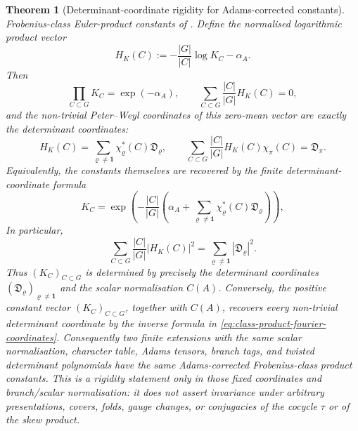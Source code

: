 \documentclass[11pt,a4paper]{amsart}
\theoremstyle{plain}
\newtheorem{theorem}{Theorem}[section]
\theoremstyle{definition}
\theoremstyle{remark}
\begin{document}
\begin{theorem}[Determinant-coordinate rigidity for Adams-corrected constants]
  Frobenius-class Euler-product constants of
  .  Define the normalised logarithmic
  product vector
  \begin{equation}\label{eq:class-product-log-vector}
    H_K(C):=-\frac{|G|}{|C|}\log K_C-\alpha_A .
  \end{equation}
  Then
  \begin{equation}\label{eq:class-product-normalisation-constraint}
    \prod_{C\subset G}K_C=\exp(-\alpha_A),
    \qquad
    \sum_{C\subset G}\frac{|C|}{|G|}H_K(C)=0,
  \end{equation}
  and the non-trivial Peter--Weyl coordinates of this zero-mean vector are
  exactly the determinant coordinates:
  \begin{equation}\label{eq:class-product-fourier-coordinates}
    H_K(C)=
    \sum_{\varrho\ne\mathbf1}
      \chi_\varrho^\ast(C)\mathfrak D_\varrho,
    \qquad
    \sum_{C\subset G}\frac{|C|}{|G|}H_K(C)\chi_\pi(C)
    =\mathfrak D_\pi.
  \end{equation}
  Equivalently, the constants themselves are recovered by the finite
  determinant-coordinate formula
  \begin{equation}\label{eq:class-product-rigidity-product-formula}
    K_C=
    \exp\!\left(
      -\frac{|C|}{|G|}
      \left(
        \alpha_A+
        \sum_{\varrho\ne\mathbf1}
          \chi_\varrho^\ast(C)\mathfrak D_\varrho
      \right)
    \right),
  \end{equation}
  In particular,
  \begin{equation}\label{eq:class-product-parseval}
    \sum_{C\subset G}\frac{|C|}{|G|}|H_K(C)|^2
    =
    \sum_{\varrho\ne\mathbf1}|\mathfrak D_\varrho|^2.
  \end{equation}
  Thus \((K_C)_{C\subset G}\) is determined by precisely the determinant
  coordinates \((\mathfrak D_\varrho)_{\varrho\ne\mathbf1}\) and the scalar
  normalisation \(C(A)\).  Conversely, the positive constant vector
  \((K_C)_{C\subset G}\), together with \(C(A)\), recovers every
  non-trivial determinant coordinate by the inverse formula in
  \eqref{eq:class-product-fourier-coordinates}.  Consequently two finite
  extensions with the same scalar normalisation, character table, Adams
  tensors, branch tags, and twisted determinant polynomials have the same
  Adams-corrected Frobenius-class product constants.  This is a rigidity
  statement only in those fixed coordinates and branch/scalar normalisation:
  it does not assert invariance under arbitrary presentations, covers, folds,
  gauge changes, or conjugacies of the cocycle \(\tau\) or of the skew product.
\end{theorem}
\end{document}
